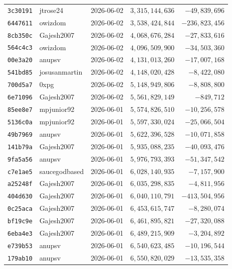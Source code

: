 {\begin{longtable}{@{}lllrr@{}}
\texttt{3c30191} & jtrose24 & 2026-06-02 & $3{,}315{,}144{,}636$ & $-49{,}839{,}696$\\
\texttt{6447611} & owizdom & 2026-06-02 & $3{,}538{,}424{,}844$ & $-236{,}823{,}456$\\
\texttt{8cb350c} & Gajesh2007 & 2026-06-02 & $4{,}068{,}676{,}284$ & $-27{,}833{,}616$\\
\texttt{564c4c3} & owizdom & 2026-06-02 & $4{,}096{,}509{,}900$ & $-34{,}503{,}360$\\
\texttt{00e3a20} & anupsv & 2026-06-02 & $4{,}131{,}013{,}260$ & $-17{,}007{,}168$\\
\texttt{541bd85} & josusanmartin & 2026-06-02 & $4{,}148{,}020{,}428$ & $-8{,}422{,}080$\\
\texttt{700d5a7} & 0xpg & 2026-06-02 & $5{,}148{,}949{,}806$ & $-8{,}808{,}800$\\
\texttt{6e71096} & Gajesh2007 & 2026-06-02 & $5{,}561{,}829{,}149$ & $-849{,}712$\\
\texttt{85ee8e7} & mpjunior92 & 2026-06-01 & $5{,}574{,}826{,}510$ & $-10{,}256{,}578$\\
\texttt{5136c0a} & mpjunior92 & 2026-06-01 & $5{,}597{,}330{,}024$ & $-25{,}066{,}504$\\
\texttt{49b7969} & anupsv & 2026-06-01 & $5{,}622{,}396{,}528$ & $-10{,}071{,}858$\\
\texttt{141b79a} & Gajesh2007 & 2026-06-01 & $5{,}935{,}088{,}235$ & $-40{,}093{,}476$\\
\texttt{9fa5a56} & anupsv & 2026-06-01 & $5{,}976{,}793{,}393$ & $-51{,}347{,}542$\\
\texttt{c7e1ae5} & saucegodbased & 2026-06-01 & $6{,}028{,}140{,}935$ & $-7{,}157{,}900$\\
\texttt{a25248f} & Gajesh2007 & 2026-06-01 & $6{,}035{,}298{,}835$ & $-4{,}811{,}956$\\
\texttt{404d630} & Gajesh2007 & 2026-06-01 & $6{,}040{,}110{,}791$ & $-413{,}504{,}956$\\
\texttt{0c25aca} & Gajesh2007 & 2026-06-01 & $6{,}453{,}615{,}747$ & $-8{,}280{,}074$\\
\texttt{bf19c9e} & Gajesh2007 & 2026-06-01 & $6{,}461{,}895{,}821$ & $-27{,}320{,}088$\\
\texttt{6eba4e3} & Gajesh2007 & 2026-06-01 & $6{,}489{,}215{,}909$ & $-3{,}204{,}892$\\
\texttt{e739b53} & anupsv & 2026-06-01 & $6{,}540{,}623{,}485$ & $-10{,}196{,}544$\\
\texttt{179ab10} & anupsv & 2026-06-01 & $6{,}550{,}820{,}029$ & $-13{,}535{,}358$\\

\end{longtable}}
